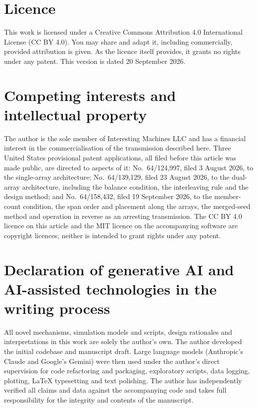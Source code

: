 \documentclass[preprint,12pt,number]{elsarticle}
\begin{document}
\section*{Licence}

This work is licensed under a Creative Commons Attribution 4.0 International License (CC BY 4.0). You may share and adapt it, including commercially, provided attribution is given. As the licence itself provides, it grants no rights under any patent. This version is dated 20 September 2026.

\section*{Competing interests and intellectual property}

The author is the sole member of Interesting Machines LLC and has a financial interest in the commercialisation of the transmission described here. Three United States provisional patent applications, all filed before this article was made public, are directed to aspects of it: No.~64/124,997, filed 3 August 2026, to the single-array architecture; No.~64/139,129, filed 23 August 2026, to the dual-array architecture, including the balance condition, the interleaving rule and the design method; and No.~64/158,432, filed 19 September 2026, to the member-count condition, the span order and placement along the arrays, the merged-seed method and operation in reverse as an arresting transmission. The CC BY 4.0 licence on this article and the MIT licence on the accompanying software are copyright licences; neither is intended to grant rights under any patent.

\section*{Declaration of generative AI and AI-assisted technologies in the writing process}

All novel mechanisms, simulation models and scripts, design rationales and interpretations in this work are solely the author's own. The author developed the initial codebase and manuscript draft. Large language models (Anthropic's Claude and Google's Gemini) were then used under the author's direct supervision for code refactoring and packaging, exploratory scripts, data logging, plotting, \LaTeX{} typesetting and text polishing. The author has independently verified all claims and data against the accompanying code and takes full responsibility for the integrity and contents of the manuscript.

\clearpage
{}

\end{document}
